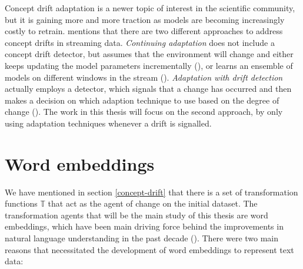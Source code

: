 \documentclass[12pt]{extreport}
\begin{document}
Concept drift adaptation is a newer topic of interest in the scientific community, but it is gaining more and more traction as models are becoming increasingly costly to retrain. \cite{hht} mentions that there are two different approaches to address concept drifts in streaming data. \emph{Continuing adaptation} does not include a concept drift detector, but assumes that the environment will change and either keeps updating the model parameters incrementally (\cite{adwin}), or learns an ensemble of models on different windows in the stream (\cite{incremental-learning-of-concept-drift}). \emph{Adaptation with drift detection} actually employs a detector, which signals that a change has occurred and then makes a decision on which adaption technique to use based on the degree of change (\cite{concept-drift-detection-for-streaming-data}). The work in this thesis will focus on the second approach, by only using adaptation techniques whenever a drift is signalled.

\section{Word embeddings} \label{sec:word-embeddings}

We have mentioned in section \ref{concept-drift} that there is a set of transformation functions $\mathbb{T}$ that act as the agent of change on the initial dataset. The transformation agents that will be the main study of this thesis are word embeddings, which have been main driving force behind the improvements in natural language understanding in the past decade (\cite{word-embedding-survey}). There were two main reasons that necessitated the development of word embeddings to represent text data:
\end{document}
